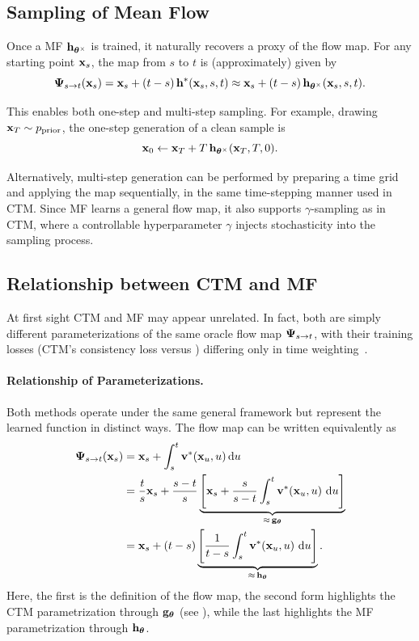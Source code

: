 \subsection{Sampling of Mean Flow}
Once a MF ${\mathbf{h}}_{{\bm{\theta}}^\times}$ is trained, it naturally recovers a proxy of the flow
map. For any starting point ${\mathbf{x}}_s$, the map from $s$ to $t$ is (approximately) given by
\[
{\bm{\Psi}}_{s\to t}({\mathbf{x}}_s) = {\mathbf{x}}_s + (t-s)\,{\mathbf{h}}^*({\mathbf{x}}_s,s,t)
  \approx   {\mathbf{x}}_s + (t-s)\,{\mathbf{h}}_{{\bm{\theta}}^\times}({\mathbf{x}}_s,s,t).
\]

This enables both one-step and multi-step sampling. For example, drawing
${\mathbf{x}}_T\sim p_{\mathrm{prior}}$, the one-step generation of a clean sample is
\[
{\mathbf{x}}_0  \leftarrow  {\mathbf{x}}_T + T\,{\mathbf{h}}_{{\bm{\theta}}^\times}({\mathbf{x}}_T,T,0).
\]

Alternatively, multi-step generation can be performed by preparing a time grid
and applying the map sequentially, in the same time-stepping manner used in
CTM. Since MF learns a general flow map, it also supports $\gamma$-sampling
as in CTM, where a controllable hyperparameter $\gamma$ injects stochasticity
into the sampling process.



\subsection{Relationship between CTM and MF}\label{subsec:equivalence-ctm-mf}
At first sight CTM and MF may appear unrelated.  
In fact, both are simply different parameterizations of the same oracle flow map ${\bm{\Psi}}_{s\to t}$, with their training losses (CTM’s consistency loss versus ) differing only in time weighting~\citep{hu2025cmt}.

\paragraph{Relationship of Parameterizations.}
Both methods operate under the same general framework but represent the learned function in distinct ways.  
The flow map can be written equivalently as
\begin{align*}
{\bm{\Psi}}_{s\to t}({\mathbf{x}}_s)
& = {\mathbf{x}}_s + \int_s^t {\mathbf{v}}^*({\mathbf{x}}_u, u)\mathop{}\!\mathrm{d} u \\
&= \frac{t}{s}{\mathbf{x}}_s
   + \frac{s-t}{s}\underbrace{\Bigg[{\mathbf{x}}_s + \frac{s}{s-t}\int_s^t {\mathbf{v}}^*({\mathbf{x}}_u,u)\,\mathop{}\!\mathrm{d} u\Bigg]}_{\approx\,{\mathbf{g}}_{\bm{\theta}}} \\
&= {\mathbf{x}}_s + (t-s)\underbrace{\Bigg[\frac{1}{t-s}\int_s^t {\mathbf{v}}^*({\mathbf{x}}_u,u)\,\mathop{}\!\mathrm{d} u\Bigg]}_{\approx\,{\mathbf{h}}_{\bm{\theta}}}.
\end{align*}
Here, the first is the definition of the flow map, the second form highlights the CTM parametrization through ${\mathbf{g}}_{\bm{\theta}}$ (see ), while the last highlights the MF parametrization through ${\mathbf{h}}_{\bm{\theta}}$.  


